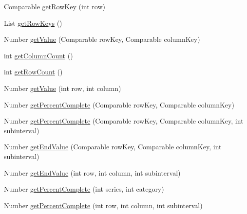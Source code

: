 \begin{DoxyCompactItemize}
\item 
Comparable \mbox{\hyperlink{classorg_1_1jfree_1_1data_1_1gantt_1_1_sliding_gantt_category_dataset_abb1a58ac4db1497c2874e7a10e0f2026}{get\+Row\+Key}} (int row)
\item 
List \mbox{\hyperlink{classorg_1_1jfree_1_1data_1_1gantt_1_1_sliding_gantt_category_dataset_a196f0032878b86a97a1939a269590d83}{get\+Row\+Keys}} ()
\item 
Number \mbox{\hyperlink{classorg_1_1jfree_1_1data_1_1gantt_1_1_sliding_gantt_category_dataset_aad13ed434468a34eef42391095e57ce4}{get\+Value}} (Comparable row\+Key, Comparable column\+Key)
\item 
int \mbox{\hyperlink{classorg_1_1jfree_1_1data_1_1gantt_1_1_sliding_gantt_category_dataset_ac28b02fa53e0050471f33e8de23e4330}{get\+Column\+Count}} ()
\item 
int \mbox{\hyperlink{classorg_1_1jfree_1_1data_1_1gantt_1_1_sliding_gantt_category_dataset_a161f3ba2f0f4e57a13a4f49efc945314}{get\+Row\+Count}} ()
\item 
Number \mbox{\hyperlink{classorg_1_1jfree_1_1data_1_1gantt_1_1_sliding_gantt_category_dataset_a23369183133f92682f73909a56b913b7}{get\+Value}} (int row, int column)
\item 
Number \mbox{\hyperlink{classorg_1_1jfree_1_1data_1_1gantt_1_1_sliding_gantt_category_dataset_abcb122e8ba111b0d87d1c78603a35779}{get\+Percent\+Complete}} (Comparable row\+Key, Comparable column\+Key)
\item 
Number \mbox{\hyperlink{classorg_1_1jfree_1_1data_1_1gantt_1_1_sliding_gantt_category_dataset_a9e7ab75b0f52944a95c545052cc07149}{get\+Percent\+Complete}} (Comparable row\+Key, Comparable column\+Key, int subinterval)
\item 
Number \mbox{\hyperlink{classorg_1_1jfree_1_1data_1_1gantt_1_1_sliding_gantt_category_dataset_a9a422df19aea47476fa3fae81a836eb1}{get\+End\+Value}} (Comparable row\+Key, Comparable column\+Key, int subinterval)
\item 
Number \mbox{\hyperlink{classorg_1_1jfree_1_1data_1_1gantt_1_1_sliding_gantt_category_dataset_a1b2ad0eb9fe4b2f85f8c42c3838b74e9}{get\+End\+Value}} (int row, int column, int subinterval)
\item 
Number \mbox{\hyperlink{classorg_1_1jfree_1_1data_1_1gantt_1_1_sliding_gantt_category_dataset_abcf830d408f2f594737b6c5facbc620c}{get\+Percent\+Complete}} (int series, int category)
\item 
Number \mbox{\hyperlink{classorg_1_1jfree_1_1data_1_1gantt_1_1_sliding_gantt_category_dataset_a9095742c2e0e7807b65f00fa9c520a98}{get\+Percent\+Complete}} (int row, int column, int subinterval)

\end{DoxyCompactItemize}
